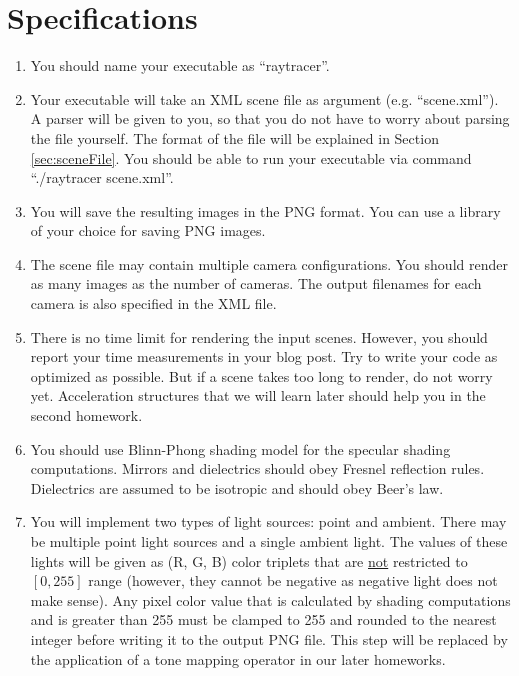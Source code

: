 \documentclass[12pt]{article}
\begin{document}
\section{Specifications}
\begin{enumerate}

\item \textbf{}You should name your executable as ``raytracer''.

\item \textbf{}Your executable will take an XML scene file as argument
(e.g. ``scene.xml''). A parser will be given to you, so that you do not
have to worry about parsing the file yourself. The format of the file
will be explained in Section \ref{sec:sceneFile}. You should be able to
run your executable via command  ``./raytracer scene.xml''.

\item \textbf{}You will save the resulting images in the PNG format. You
can use a library of your choice for saving PNG images.

\item \textbf{}The scene file may contain multiple camera
configurations. You should render as many images as the number of
cameras. The output filenames for each camera is also specified in the
XML file.

\item \textbf{}There is no time limit for rendering the input scenes.
However, you should report your time measurements in your blog post. Try
to write your code as optimized as possible. But if a scene takes too
long to render, do not worry yet. Acceleration structures that we will
learn later should help you in the second homework.

\item \textbf{}You should use Blinn-Phong shading model for the specular
shading computations.  Mirrors and dielectrics should obey Fresnel
reflection rules.  Dielectrics are assumed to be isotropic and should
obey Beer's law.

\item \textbf{}You will implement two types of light sources: point and
ambient. There may be multiple point light sources and a single ambient
light. The values of these lights will be given as (R, G, B) color
triplets that are \underline{not} restricted to $[0, 255]$ range (however,
        they cannot be negative as negative light does not make sense).
Any pixel color value that is calculated by shading computations and is
greater than 255 must be clamped to 255 and rounded to the nearest
integer before writing it to the output PNG file. This step will be
replaced by the application of a tone mapping operator in our later
homeworks.


\end{enumerate}
\end{document}
